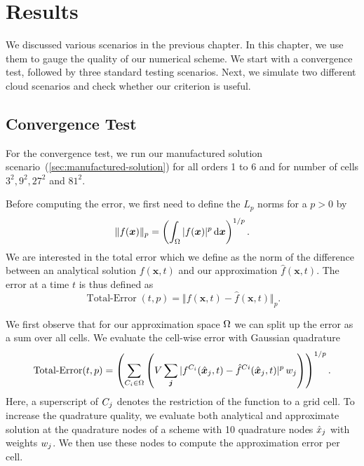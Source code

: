 \chapter{Results}\label{chap:results}
We discussed various scenarios in the previous chapter.
In this chapter, we use them to gauge the quality of our numerical scheme.
We start with a convergence test, followed by three standard testing scenarios.
Next, we simulate two different cloud scenarios and check whether our \amr{} criterion is useful.

\newcommand{\error}{\operatorname{Total-Error}}
\section{Convergence Test}\label{sec:results-convergence}
For the convergence test, we run our manufactured solution scenario~(\cref{sec:manufactured-solution}) for all orders 1 to 6 and for number of cells $3^2, 9^2, 27^2$ and $81^2 $.

Before computing the error, we first need to define the $L_p$ norms for a $p > 0$ by
\begin{equation}
  \label{eq:Lp-nrom}
  \Vert f(\bm{x}) \Vert_p = \left( \intddomain{ \vert f(\bm{x}) \vert^p}  \right)^{1/p}.
\end{equation}
We are interested in the total error which we define as the norm of the difference between an analytical solution $f(\bm{x}, t)$ and our approximation $\hat{f}(\bm{x}, t)$.
The error at a time $t$ is thus defined as
\begin{equation}
  \label{eq:error}
  \error(t,p) = \Vert f(\bm{x}, t) - \hat{f}(\bm{x}, t) \Vert_p.
\end{equation}

We first observe that for our approximation space $\broken$ we can split up the error as a sum over all cells.
We evaluate the cell-wise error with Gaussian quadrature~
 \begin{equation}
   \error(t,p) = 
   \left( \sum_{\cell[i] \in \broken}
    \left( V \sum_{\bm{j}} \vert f^{\cell[i]}(\quadNodeNd[j], t) - \hat{f}^{\cell{i}}(\quadNodeNd[j], t) \vert^p \, \quadWeight[j] \right) \right)^{1/p}.
 \end{equation}
Here, a superscript of $\cell[j]$ denotes the restriction of the function to a grid cell.
To increase the quadrature quality, we evaluate both analytical and approximate solution at the quadrature nodes of a scheme with 10 quadrature nodes $\quadNode[j]$ with weights $\quadWeight[j]$.
We then use these nodes to compute the approximation error per cell.


